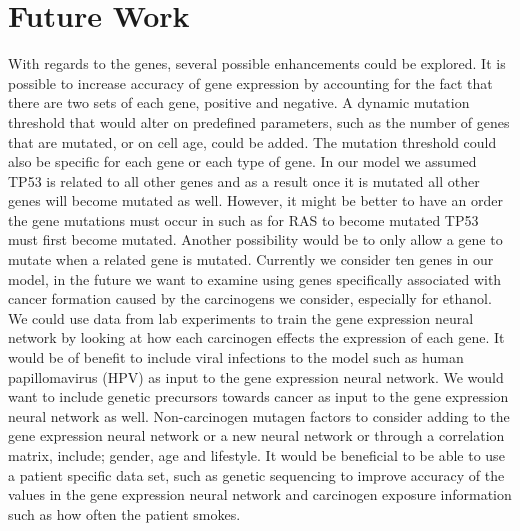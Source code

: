 \documentclass[\main/thesis.tex]{subfiles}
\begin{document}
\section{Future Work}
With regards to the genes, several possible enhancements could be explored. It is possible to increase accuracy of gene expression by accounting for the fact that there are two sets of each gene, positive and negative. A dynamic mutation threshold that would alter on predefined parameters, such as the number of genes that are mutated, or on cell age, could be added. The mutation threshold could also be specific for each gene or each type of gene. In our model we assumed TP53 is related to all other genes and as a result once it is mutated all other genes will become mutated as well. However, it might be better to have an order the gene mutations must occur in such as for RAS to become mutated TP53 must first become mutated. Another possibility would be to only allow a gene to mutate when a related gene is mutated. Currently we consider ten genes in our model, in the future we want to examine using genes specifically associated with cancer formation caused by the carcinogens we consider, especially for ethanol. We could use data from lab experiments to train the gene expression neural network by looking at how each carcinogen effects the expression of each gene. It would be of benefit to include viral infections to the model such as human papillomavirus (HPV) as input to the gene expression neural network. We would want to include genetic precursors towards cancer as input to the gene expression neural network as well. Non-carcinogen mutagen factors to consider adding to the gene expression neural network or a new neural network or through a correlation matrix, include; gender, age and lifestyle. It would be beneficial to be able to use a patient specific data set, such as genetic sequencing to improve accuracy of the values in the gene expression neural network and carcinogen exposure information such as how often the patient smokes.
\end{document}
